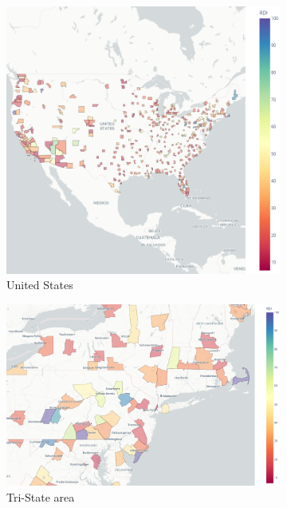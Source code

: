 \documentclass[APA,Times1COL]{WileyNJDv5} %
\begin{document}
\begin{figure}[hbt!]
	\begin{subfigure}[b]{0.32\textwidth}
		\includegraphics[width=\linewidth]{us.png}
		\caption{United States}\label{fig:us_choropleth}
	\end{subfigure}\hfill
	\begin{subfigure}[b]{0.32\textwidth}
		\includegraphics[width=\linewidth]{tristate.png}
		\caption{Tri-State area}\label{fig:tristate_choropleth}
	\end{subfigure}\hfill
	\begin{subfigure}[b]{0.32\textwidth}

\end{subfigure}
\end{figure}
\end{document}
